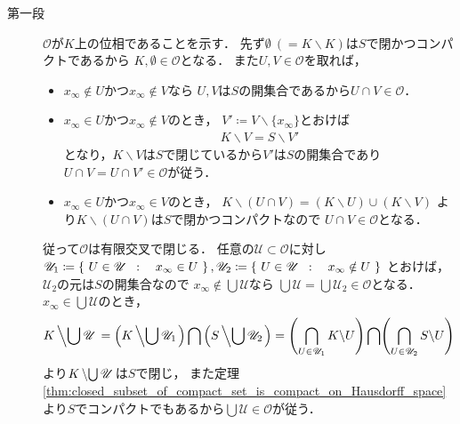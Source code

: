 	\begin{prf}\mbox{}
		\begin{description}
			\item[第一段]
				$\mathscr{O}$が$K$上の位相であることを示す．
				先ず$\emptyset\ (= K \backslash K)$は$S$で閉かつコンパクトであるから
				$K,\emptyset \in \mathscr{O}$となる．
				また$U,V \in \mathscr{O}$を取れば，
				\begin{itemize}
					\item $x_\infty \notin U$かつ$x_\infty \notin V$なら
						$U,V$は$S$の開集合であるから$U \cap V \in \mathscr{O}$．
					
					\item $x_\infty \in U$かつ$x_\infty \notin V$のとき，
						$V' \coloneqq V \backslash \{x_\infty\}$とおけば
						\begin{align}
							K \backslash V = S \backslash V'
						\end{align}
						となり，$K \backslash V$は$S$で閉じているから$V'$は$S$の開集合であり
						$U \cap V = U \cap V' \in \mathscr{O}$が従う．
						
					\item $x_\infty \in U$かつ$x_\infty \in V$のとき，
						$K \backslash (U \cap V)= (K \backslash U) \cup (K \backslash V)$
						より$K \backslash (U \cap V)$は$S$で閉かつコンパクトなので
						$U \cap V \in \mathscr{O}$となる．
				\end{itemize}
				従って$\mathscr{O}$は有限交叉で閉じる．
				任意の$\mathscr{U} \subset \mathscr{O}$に対し
				$\mathscr{U}_1 \coloneqq \left\{\ U \in \mathscr{U}\ \, : \quad x_\infty \in U\ \right\},
				\mathscr{U}_2 \coloneqq \left\{\ U \in \mathscr{U}\ \, : \quad x_\infty \notin U\ \right\}$
				とおけば，$\mathscr{U}_2$の元は$S$の開集合なので
				$x_\infty \notin \bigcup \mathscr{U}$なら
				$\bigcup \mathscr{U} = \bigcup \mathscr{U}_2 \in \mathscr{O}$となる．
				$x_\infty \in \bigcup \mathscr{U}$のとき，
				\begin{align}
					K \left\backslash \bigcup \mathscr{U} \right.
					= \left(K \left\backslash \bigcup \mathscr{U}_1 \right.\right)
					\bigcap \left(S \left\backslash \bigcup \mathscr{U}_2 \right.\right)
					= \Biggl( \bigcap_{U \in \mathscr{U}_1} K \backslash U \Biggr)
					\bigcap \Biggl( \bigcap_{U \in \mathscr{U}_2} S \backslash U \Biggr)
				\end{align}
				より$K\left\backslash \bigcup \mathscr{U}\right.$は$S$で閉じ，
				また定理\ref{thm:closed_subset_of_compact_set_is_compact_on_Hausdorff_space}
				より$S$でコンパクトでもあるから$\bigcup \mathscr{U} \in \mathscr{O}$が従う．
				

\end{description}
\end{prf}
